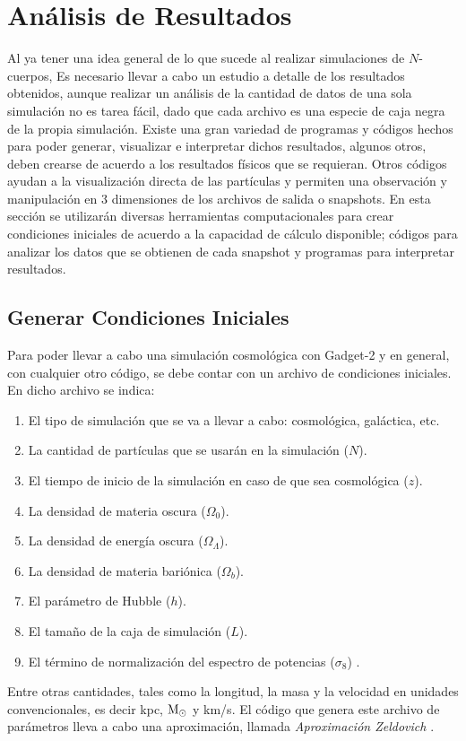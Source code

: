 \documentclass[a4paper,openright,10pt, oneside, final]{book}
\begin{document}
\chapter{Análisis de Resultados}
Al ya tener una idea general de lo que sucede al realizar simulaciones de $N$-cuerpos, Es necesario llevar a cabo un estudio a detalle de los resultados obtenidos, aunque realizar un análisis de la cantidad de datos de una sola simulación no es tarea fácil, dado que cada archivo es una especie de caja negra de la propia simulación. Existe una gran variedad de programas y códigos hechos para poder generar, visualizar e interpretar dichos resultados, algunos otros, deben crearse de acuerdo a los resultados físicos que se requieran. Otros códigos ayudan a la visualización directa de las partículas y permiten una observación  y manipulación en 3 dimensiones de los archivos de salida o \textsf{snapshots}. En esta sección se utilizarán diversas herramientas computacionales para crear condiciones iniciales de acuerdo a la capacidad de cálculo disponible; códigos para analizar los datos que se obtienen de cada \textsf{snapshot} y programas para interpretar resultados.

\section{Generar Condiciones Iniciales}
Para poder llevar a cabo una simulación cosmológica con Gadget-2 y en general, con cualquier otro código, se debe contar con un archivo de condiciones iniciales. En dicho archivo se indica:
\begin{enumerate}
\item El tipo de simulación que se va a llevar a cabo: cosmológica, galáctica, etc.
\item La cantidad de partículas que se usarán en la simulación ($N$).
\item El tiempo de inicio de la simulación en caso de que sea cosmológica ($z$).
\item La densidad de materia oscura ($\Omega_{0}$).
\item La densidad de energía oscura ($\Omega_{\Lambda}$).
\item La densidad de materia bariónica ($\Omega_{b}$).
\item El parámetro de Hubble ($h$).
\item El tamaño de la caja de simulación ($L$).
\item El término de normalización del espectro de potencias ($\sigma_{8}$) \cite{4.0}.
\end{enumerate}
Entre otras cantidades, tales como la longitud, la masa y la velocidad en unidades convencionales, es decir kpc, $\textup M_{\odot}$ y km/s. El código que genera este archivo de parámetros lleva a cabo una aproximación, llamada \textit{Aproximación Zeldovich} \cite{4.1, 4.2}. 
\end{document}

